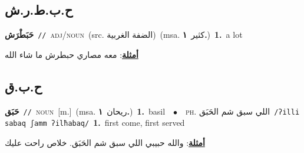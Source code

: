 \documentclass[10pt,a4paper,twoside]{article} %
\begin{document}
\begin{multicols}{2}
\vspace{-3mm}
\subsection*{\color{blue}\foreignlanguage{arabic}{ح.ب.ط.ر.ش}\color{blue}{ (ntws)}} 

{\setlength\topsep{0pt}\textbf{\foreignlanguage{arabic}{حَبَطْرَش}}\ {\color{gray}\texttt{//}\color{black}}\ \textsc{adj/noun}\ (src. \color{gray}\foreignlanguage{arabic}{الضفة الغربية}\color{black})\ \color{gray}(msa. \foreignlanguage{arabic}{كثير}~\foreignlanguage{arabic}{\textbf{١.}})\color{black}\ \textbf{1.}~a lot\  \begin{flushright}\color{gray}\foreignlanguage{arabic}{\textbf{\underline{\foreignlanguage{arabic}{أمثلة}}}: معه مصاري حبطرش ما شاء الله}\end{flushright}\color{black}} \vspace{2mm}

\vspace{-3mm}
\subsection*{\color{blue}\foreignlanguage{arabic}{ح.ب.ق}\color{blue}{}} 

{\setlength\topsep{0pt}\textbf{\foreignlanguage{arabic}{حَبَق}}\ {\color{gray}\texttt{//}\color{black}}\ \textsc{noun}\ [m.]\ \color{gray}(msa. \foreignlanguage{arabic}{ريحان}~\foreignlanguage{arabic}{\textbf{١.}})\color{black}\ \textbf{1.}~basil\ \ $\bullet$\ \ \textsc{ph.} \color{gray} \foreignlanguage{arabic}{اللي سبق شم الحَبَق}\color{black}\ {\color{gray}\texttt{/{\sffamily ʔilli sabaq ʃamm ʔilħabaq}/}\color{black}}\ \textbf{1.}~first come, first served\  \begin{flushright}\color{gray}\foreignlanguage{arabic}{\textbf{\underline{\foreignlanguage{arabic}{أمثلة}}}: والله حبيبي اللي سبق شم الحَبَق. خلاص راحت عليك}\end{flushright}\color{black}} \vspace{2mm}


\end{multicols}
\end{document}
